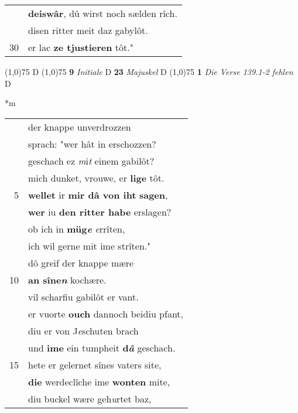 \documentclass[8pt,a4paper,notitlepage]{article}
\begin{document}
\begin{table}[ht]
\begin{minipage}[t]{0.5\linewidth}
\begin{tabular}{rl}
 & \textbf{deiswâr}, dû wirst noch sælden rîch.\\ 
 & disen ritter meit daz gabylôt.\\ 
30 & er lac \textbf{ze tjustieren} tôt."\\ 
\end{tabular}
\scriptsize
\line(1,0){75} \newline
D \newline
\line(1,0){75} \newline
\textbf{9} \textit{Initiale} D  \textbf{23} \textit{Majuskel} D  \newline
\line(1,0){75} \newline
\textbf{1} \textit{Die Verse 139.1-2 fehlen} D  \newline
\end{minipage}
\hspace{0.5cm}
\begin{minipage}[t]{0.5\linewidth}
\small
\begin{center}*m
\end{center}
\begin{tabular}{rl}
 & der knappe unverdrozzen\\ 
 & sprach: "wer hât in erschozzen?\\ 
 & geschach ez \textit{m}i\textit{t} einem gabilôt?\\ 
 & mich dunket, vrouwe, er \textbf{lige} tôt.\\ 
5 & \textbf{wellet} ir \textbf{mir dâ von iht} \textbf{sagen},\\ 
 & \textbf{wer} iu \textbf{den ritter habe} erslagen?\\ 
 & ob ich in \textbf{müg\textit{e}} \textit{e}rrîten,\\ 
 & ich wil gerne mit ime strîten."\\ 
 & dô greif der knappe mære\\ 
10 & \textbf{an sîne\textit{n}} kochære.\\ 
 & vil scharfiu gabilôt er vant.\\ 
 & er vuorte \textbf{ouch} dannoch beidiu pfant,\\ 
 & diu er von J\textit{e}schuten brach\\ 
 & und \textbf{ime} ein tumpheit \textbf{d\textit{â}} geschach.\\ 
15 & hete er gelernet sînes vaters site,\\ 
 & \textbf{die} werdeclîche ime \textbf{wonten} mite,\\ 
 & diu buckel wære geh\textit{u}rtet baz,\\ 

\end{tabular}
\end{minipage}
\end{table}
\end{document}
